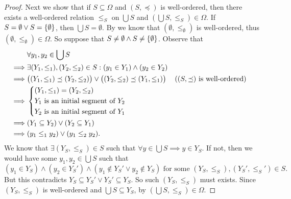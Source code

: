 \begin{proof}
  Next we show that if \(S \subseteq \Omega\) and \((S, \preceq)\) is well-ordered, then there exists a well-ordered relation \(\leq_S\) on \(\bigcup S\) and \((\bigcup S, \leq_S) \in \Omega\).
  If \(S = \emptyset \lor S = \left\lbrace\emptyset\right\rbrace\), then \(\bigcup S = \emptyset\).
  By  we know that \((\emptyset, \leq_{\emptyset})\) is well-ordered, thus \((\emptyset, \leq_{\emptyset}) \in \Omega\).
  So suppose that \(S \neq \emptyset \land S \neq \left\lbrace\emptyset\right\rbrace\).
  Observe that
  \begin{align*}
             & \forall y_1, y_2 \in \bigcup S                                                                                                                  \\
    \implies & \exists (Y_1, \leq_1), (Y_2, \leq_2) \in S : (y_1 \in Y_1) \land (y_2 \in Y_2)                                                                  \\
    \implies & \big((Y_1, \leq_1) \preceq (Y_2, \leq_2)\big) \lor \big((Y_2, \leq_2) \preceq (Y_1, \leq_1)\big) &  & \text{(\((S, \preceq)\) is well-ordered)} \\
    \implies & \begin{dcases}
                 (Y_1, \leq_1) = (Y_2, \leq_2)             \\
                 Y_1 \text{ is an initial segment of } Y_2 \\
                 Y_2 \text{ is an initial segment of } Y_1
               \end{dcases}                                                                                                       \\
    \implies & (Y_1 \subseteq Y_2) \lor (Y_2 \subseteq Y_1)                                                                                                    \\
    \implies & (y_1 \leq_1 y_2) \lor (y_1 \leq_2 y_2).
  \end{align*}
  We know that \(\exists (Y_S, \leq_S) \in S\) such that \(\forall y \in \bigcup S \implies y \in Y_S\).
  If not, then we would have some \(y_1, y_2 \in \bigcup S\) such that
  \[
    (y_1 \in Y_S) \land (y_2 \in Y_S') \land (y_1 \notin Y_S' \lor y_2 \notin Y_S) \text{ for some } (Y_S, \leq_S), (Y_S', \leq_S') \in S.
  \]
  But this contradicts \(Y_S \subseteq Y_S' \lor Y_S' \subseteq Y_S\).
  So such \((Y_S, \leq_S)\) must exists.
  Since \((Y_S, \leq_S)\) is well-ordered and \(\bigcup S \subseteq Y_S\), by  \((\bigcup S, \leq_S) \in \Omega\).


\end{proof}

